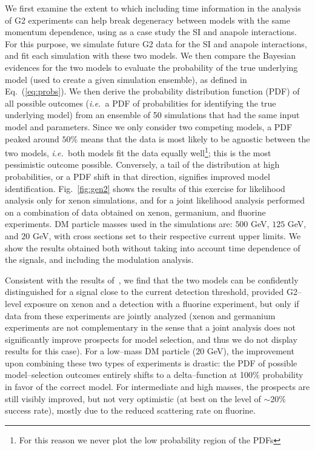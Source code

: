 \documentclass[11pt, a4paper]{article}
\newcommand{\ie}{{\it i.e.~}}  \newcommand{\eg}{{\it e.g.~}}
\newcommand{\Eq}[1]{Eq.~(\ref{#1})} \newcommand{\Eqs}[2]{Eqs.~(\ref{#1}) and (\ref{#2})} \newcommand{\Eqm}[2]{Eqs.~(\ref{#1}) through (\ref{#2})}
\newcommand{\Fig}[1]{Fig.~\ref{#1}} \newcommand{\Figs}[2]{Figs.~\ref{#1} and \ref{#2}}
\begin{document}
We first examine the extent to which including time information in the analysis of G2 experiments can help break degeneracy between models with the same momentum dependence, using as a case study the SI and anapole interactions. For this purpose, we simulate future G2 data for the SI and anapole interactions, and fit each simulation with these two models. We then compare the Bayesian evidences for the two models to evaluate the probability of the true underlying model (used to create a given simulation ensemble), as defined in \Eq{eq:probs}. We then derive the probability distribution function (PDF) of all possible outcomes (\ie a PDF of probabilities for identifying the true underlying model) from an ensemble of 50 simulations that had the same input model and parameters. Since we only consider two competing models, a PDF peaked around $50\%$ means that the data is most likely to be agnostic between the two models, \ie both models fit the data equally well\footnote{For this reason we never plot the low probability region of the PDFs}; this is the most pessimistic outcome possible. Conversely, a tail of the distribution at high probabilities, or a PDF shift in that direction, signifies improved model identification. \Fig{fig:gen2} shows the results of this exercise for likelihood analysis only for xenon simulations, and for a joint likelihood analysis performed on a combination of data obtained on xenon, germanium, and fluorine experiments.  DM particle masses used in the simulations are: $500$ GeV, $125$ GeV, and $20$ GeV, with cross sections set to their respective current upper limits. We show the results obtained both without taking into account time dependence of the signals, and including the modulation analysis. 


Consistent with the results of~\cite{Gluscevic:2015sqa}, we find that the two models can be confidently distinguished for a signal close to the current detection threshold, provided G2--level exposure on xenon and a detection with a fluorine experiment, but only if data from these experiments are jointly analyzed (xenon and germanium experiments are not complementary in the sense that a joint analysis does not significantly improve prospects for model selection, and thus we do not display results for this case). For a low--mass DM particle (20 GeV), the improvement upon combining these two types of experiments is drastic: the PDF of possible model--selection outcomes entirely shifts to a delta--function at 100$\%$ probability in favor of the correct model. For intermediate and high masses, the prospects are still visibly improved, but not very optimistic (at best on the level of $\sim$20$\%$ success rate), mostly due to the reduced scattering rate on fluorine.  
\end{document}
